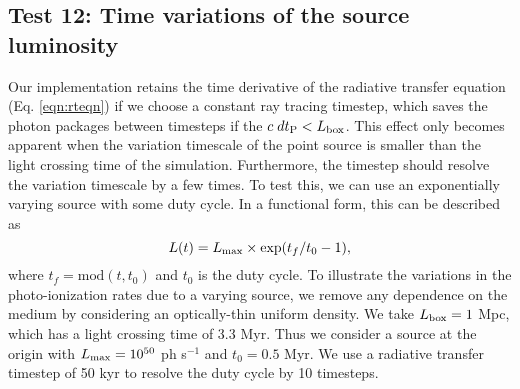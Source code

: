 \documentclass[12pt,preprint]{aastex}
\begin{document}


\subsection{Test 12: Time variations of the source luminosity}

Our implementation retains the time derivative of the radiative
transfer equation (Eq. \ref{eqn:rteqn}) if we choose a constant ray
tracing timestep, which saves the photon packages between timesteps if
the $c\;dt_{\rm P} < L_{\rm box}$.  This effect only becomes apparent
when the variation timescale of the point source is smaller than the
light crossing time of the simulation.  Furthermore, the timestep
should resolve the variation timescale by a few times.  To test this,
we can use an exponentially varying source with some duty cycle.  In a
functional form, this can be described as
%
\begin{equation}
  \label{eqn:test13}
  L(t) = L_{\rm max} \times \exp(t_f/t_0 - 1),
\end{equation}
%
where $t_f = \mathrm{mod}(t,t_0)$ and $t_0$ is the duty cycle.  To
illustrate the variations in the photo-ionization rates due to a
varying source, we remove any dependence on the medium by considering
an optically-thin uniform density.  We take $L_{\rm box} = 1$ Mpc,
which has a light crossing time of 3.3 Myr.  Thus we consider a source
at the origin with $L_{\rm max} = 10^{50}$ ph s$^{-1}$ and $t_0 = 0.5$
Myr.  We use a radiative transfer timestep of 50 kyr to resolve the
duty cycle by 10 timesteps.
\end{document}
